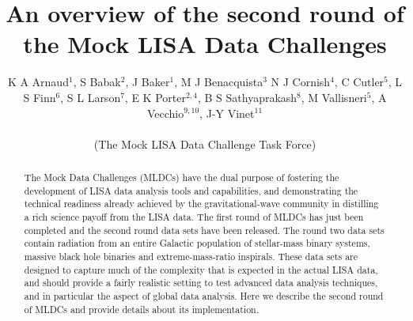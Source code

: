 \documentclass[12pt]{iopart}
\begin{document}
\title[The second round of Mock LISA Data Challenges]{An overview of the second round of the Mock LISA Data Challenges}

\author{K A Arnaud$^1$,
S Babak$^2$,
J Baker$^1$,
M J Benacquista$^3$
N J Cornish$^4$,
C Cutler$^{5}$,
L S Finn$^{6}$,
S L Larson$^{7}$,
E K Porter$^{2,4}$,
B S Sathyaprakash$^{8}$,
M Vallisneri$^{5}$,
A Vecchio$^{9,10}$,
J-Y Vinet$^{11}$\\
\centerline{(The Mock LISA Data Challenge Task Force)}
}

\address{$^1$ Gravitational Astrophysics Laboratory, NASA Goddard Space Flight Center, 8800 Greenbelt Rd, Greenbelt, MD 20771, US}
\address{$^2$ Max-Planck-Institut f\"{u}r Gravitationsphysik (Albert-Einstein-Institut), Am M\"{u}hlenberg 1, D-14476 Golm bei Potsdam, Germany}
\address{$^3$ Center for Gravitational Wave Astronomy, University of Texas at Brownsville, Brownsville, TX 78520, US}
\address{$^4$ Dept.\ of Phys., Montana State University, Bozeman, MT 59717, US}
\address{$^{5}$ Jet Propulsion Laboratory, California Institute of Technology, Pasadena, CA 91109, US}
\address{$^{6}$ Center for Gravitational Wave Physics, The Pennsylvania State University, University Park, PA 16802, US}
\address{$^{7}$ Dept.\ of Phys., Weber State University, 2508 University of Circle, Ogden, UT 84408, US}
\address{$^{8}$ Dept.\ of Phys.\ and Astron., Cardiff University, 5, The Parade, Cardiff, CF24 3YB, UK}
\address{$^{9}$ School of Phys.\ and Astron., University of Birmingham, Edgbaston, Birmingham B152TT, UK}
\address{$^{10}$ Dept.\ of Phys.\ and Astron., Northwestern University, Evanston, IL 60208, US}
\address{$^{11}$ Department ARTEMIS, Observatoire de la C\^{o}te d'Azur, BP 429, 06304 Nice, France}
\begin{abstract}
The Mock Data Challenges (MLDCs) have the dual purpose of fostering the development of LISA data analysis tools and capabilities, and demonstrating the technical readiness already achieved by the gravitational-wave community in distilling a rich science payoff from the LISA data. The first round of MLDCs has just been completed and the second round data sets have been released. The round two data sets contain radiation from an entire Galactic population of stellar-mass binary systems, massive black hole binaries and extreme-mass-ratio inspirals. These data sets are designed to capture much of the complexity that is expected in the actual LISA data, and should provide a fairly realistic setting to test advanced data analysis techniques, and in particular the aspect of global data analysis. Here we describe the second round of MLDCs and provide details about its implementation.

\end{abstract}
\end{document}
